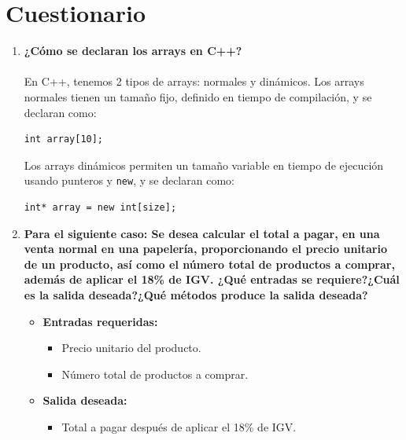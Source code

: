 \documentclass{article}
\begin{document}
\clearpage

\section{Cuestionario}
    \begin{enumerate}
        \item \textbf{¿Cómo se declaran los arrays en C++?} \\\\
        En C++, tenemos 2 tipos de arrays: normales y dinámicos. Los arrays normales tienen un tamaño fijo, definido en tiempo de compilación, y se declaran como:
        
            \begin{lstlisting}
int array[10]; 
            \end{lstlisting}
            
            Los arrays dinámicos permiten un tamaño variable en tiempo de ejecución usando punteros y \texttt{new}, y se declaran como:
            \begin{lstlisting}
int* array = new int[size];
            \end{lstlisting}
        
        \item \textbf{Para el siguiente caso: Se desea calcular el total a pagar, en una venta normal en una papelería,
        proporcionando el precio unitario de un producto, así como el número total de productos a comprar,
        además de aplicar el 18\% de IGV. ¿Qué entradas se requiere?¿Cuál es la salida deseada?¿Qué métodos
        produce la salida deseada?} 
            
            \begin{itemize}
                \item \textbf{Entradas requeridas:}
                
                \begin{itemize}
                    \item Precio unitario del producto.
                    \item Número total de productos a comprar.
                \end{itemize}
                
                \item \textbf{Salida deseada:}
                
                \begin{itemize}
                    \item Total a pagar después de aplicar el 18\% de IGV.
                \end{itemize}
                

\end{itemize}
\end{enumerate}
\end{document}

